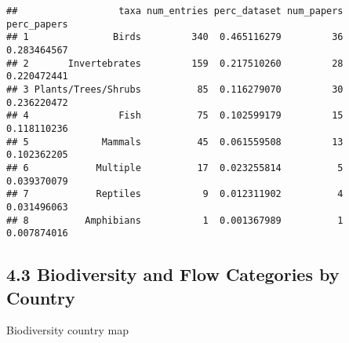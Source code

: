 \documentclass[
]{article}
\begin{document}
\begin{verbatim}
##                  taxa num_entries perc_dataset num_papers perc_papers
## 1               Birds         340  0.465116279         36 0.283464567
## 2       Invertebrates         159  0.217510260         28 0.220472441
## 3 Plants/Trees/Shrubs          85  0.116279070         30 0.236220472
## 4                Fish          75  0.102599179         15 0.118110236
## 5             Mammals          45  0.061559508         13 0.102362205
## 6            Multiple          17  0.023255814          5 0.039370079
## 7            Reptiles           9  0.012311902          4 0.031496063
## 8          Amphibians           1  0.001367989          1 0.007874016
\end{verbatim}

\hypertarget{biodiversity-and-flow-categories-by-country}{%
\subsection{4.3 Biodiversity and Flow Categories by
Country}\label{biodiversity-and-flow-categories-by-country}}

Biodiversity country map
\end{document}
